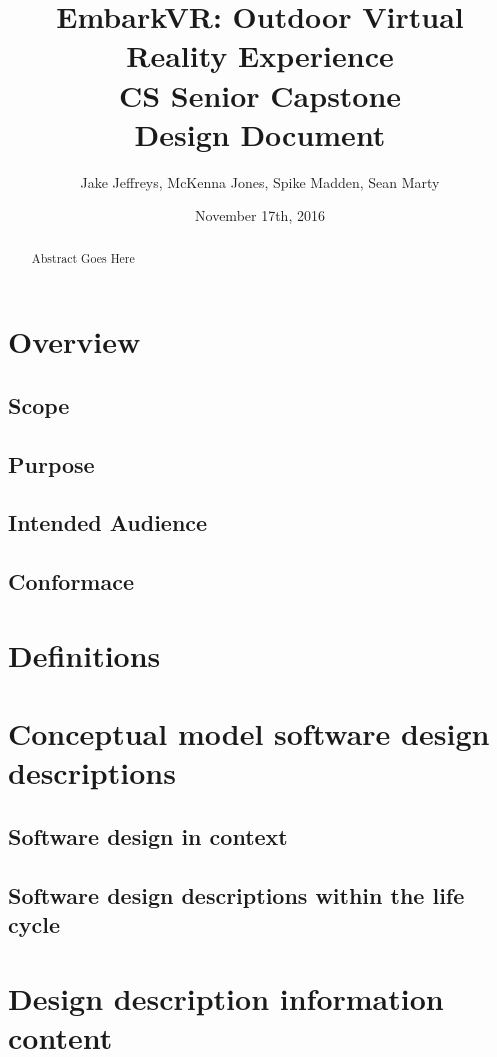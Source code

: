 \documentclass[10pt,journal,compsoc,onecolumn, draftclsnofoot]{IEEEtran}
\title{
EmbarkVR: Outdoor Virtual Reality Experience \\
CS Senior Capstone \\
Design Document\\
\vspace{3cm}
}
\author{Jake Jeffreys, McKenna Jones, Spike Madden, Sean Marty}
\date{November 17th, 2016}
\begin{document}
\begin{titlepage}
\vspace{3cm}
\maketitle
\vspace{3cm}
\begin{abstract}
Abstract Goes Here
\end{abstract}

\end{titlepage}

\tableofcontents
\clearpage

\section{Overview}
\subsection{Scope}
\subsection{Purpose}
\subsection{Intended Audience}
\subsection{Conformace}

\section{Definitions}

\section{Conceptual model software design descriptions}
\subsection{Software design in context}
\subsection{Software design descriptions within the life cycle}

\section{Design description information content}
\end{document}
